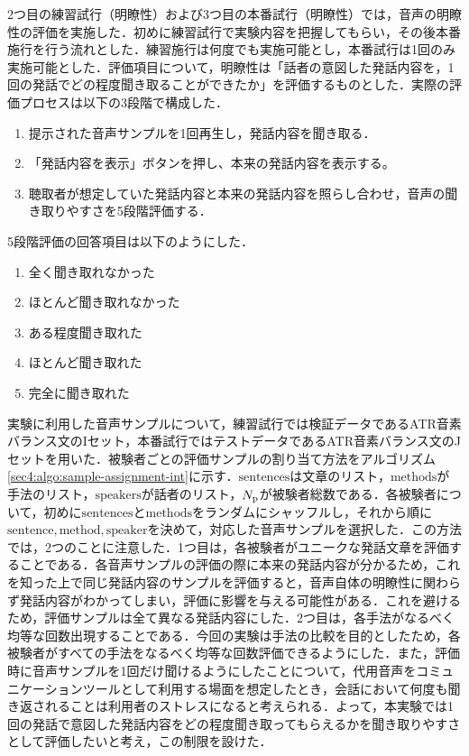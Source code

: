 2つ目の練習試行（明瞭性）および3つ目の本番試行（明瞭性）では，音声の明瞭性の評価を実施した．初めに練習試行で実験内容を把握してもらい，その後本番施行を行う流れとした．練習施行は何度でも実施可能とし，本番試行は1回のみ実施可能とした．評価項目について，明瞭性は「話者の意図した発話内容を，1回の発話でどの程度聞き取ることができたか」を評価するものとした．実際の評価プロセスは以下の3段階で構成した．
\begin{enumerate}
    \item 提示された音声サンプルを1回再生し，発話内容を聞き取る．
    \item 「発話内容を表示」ボタンを押し、本来の発話内容を表示する。
    \item 聴取者が想定していた発話内容と本来の発話内容を照らし合わせ，音声の聞き取りやすさを5段階評価する．
\end{enumerate}
5段階評価の回答項目は以下のようにした．
\begin{enumerate}
    \item 全く聞き取れなかった
    \item ほとんど聞き取れなかった
    \item ある程度聞き取れた
    \item ほとんど聞き取れた
    \item 完全に聞き取れた
\end{enumerate}
実験に利用した音声サンプルについて，練習試行では検証データであるATR音素バランス文のIセット，本番試行ではテストデータであるATR音素バランス文のJセットを用いた．被験者ごとの評価サンプルの割り当て方法をアルゴリズム\ref{sec4:algo:sample-assignment-int}に示す．$\text{sentences}$は文章のリスト，$\text{methods}$が手法のリスト，$\text{speakers}$が話者のリスト，$N_{\text{p}}$が被験者総数である．各被験者について，初めに$\text{sentences}$と$\text{methods}$をランダムにシャッフルし，それから順に$\text{sentence}, \text{method}, \text{speaker}$を決めて，対応した音声サンプルを選択した．この方法では，2つのことに注意した．1つ目は，各被験者がユニークな発話文章を評価することである．各音声サンプルの評価の際に本来の発話内容が分かるため，これを知った上で同じ発話内容のサンプルを評価すると，音声自体の明瞭性に関わらず発話内容がわかってしまい，評価に影響を与える可能性がある．これを避けるため，評価サンプルは全て異なる発話内容にした．2つ目は，各手法がなるべく均等な回数出現することである．今回の実験は手法の比較を目的としたため，各被験者がすべての手法をなるべく均等な回数評価できるようにした．また，評価時に音声サンプルを1回だけ聞けるようにしたことについて，代用音声をコミュニケーションツールとして利用する場面を想定したとき，会話において何度も聞き返されることは利用者のストレスになると考えられる．よって，本実験では1回の発話で意図した発話内容をどの程度聞き取ってもらえるかを聞き取りやすさとして評価したいと考え，この制限を設けた．
